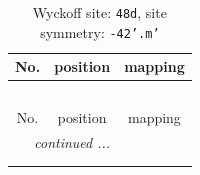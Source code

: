 \documentclass[fleqn,8pt]{jsarticle}
\begin{document}
\renewcommand{\arraystretch}{1.2}
\begin{longtable}{ccc}
\caption{Wyckoff site: {\tt 48d}, site symmetry: {\tt -42'.m'}}
 \\
 \hline \hline
No. & position & mapping \\ \hline \endfirsthead

\multicolumn{2}{l}{\tablename\ \thetable{}} \\
 \hline \hline
No. & position & mapping \\ \hline \endhead

 \hline \hline
\multicolumn{2}{r}{\footnotesize\it continued ...} \\ \endfoot

 \hline \hline
\multicolumn{2}{r}{} \\ \endlastfoot


\end{longtable}
\end{document}
